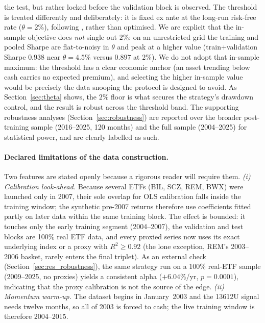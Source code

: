 the test, but rather locked before the validation block is observed.
The threshold is treated differently and deliberately: it is fixed ex ante at
the long-run risk-free rate ($\theta=2\%$), following \citet{antonacci2014}, rather
than optimised. We are explicit that the in-sample objective does \emph{not} single
out $2\%$: on an unrestricted grid the training and pooled Sharpe are flat-to-noisy
in $\theta$ and peak at a higher value (train+validation Sharpe $0.938$ near
$\theta=4.5\%$ versus $0.897$ at $2\%$). We do not adopt that in-sample maximum: the
threshold has a clear economic anchor (an asset trending below cash carries no
expected premium), and selecting the higher in-sample value would be precisely the
data snooping the protocol is designed to avoid. As Section~\ref{sec:theta} shows,
the $2\%$ floor is what secures the strategy's drawdown control, and the result is
robust across the threshold band. The
supporting robustness analyses
(Section~\ref{sec:robustness}) are reported over the broader post-training sample
(2016--2025, 120 months) and the full sample (2004--2025) for statistical power,
and are clearly labelled as such.

\paragraph{Declared limitations of the data construction.}
Two features are stated openly because a rigorous reader will require them.
\emph{(i) Calibration look-ahead.} Because several ETFs (BIL, SCZ, REM, BWX) were
launched only in 2007, their sole overlap for OLS calibration falls inside the
training window; the synthetic pre-2007 returns therefore use coefficients fitted
partly on later data within the same training block. The effect is bounded: it
touches only the early training segment (2004--2007), the validation and test
blocks are 100\% real ETF data, and every proxied series now uses its exact
underlying index or a proxy with $R^2 \geq 0.92$ (the lone exception, REM's
2003--2006 basket, rarely enters the final triplet). As an external check
(Section~\ref{sec:res_robustness}), the same strategy run on a 100\% real-ETF
sample (2009--2025, no proxies) yields a consistent alpha ($+6.04\%$/yr,
$p = 0.0001$), indicating that the proxy calibration is not the source of the edge.
\emph{(ii) Momentum warm-up.} The dataset begins in January~2003 and the 13612U
signal needs twelve months, so all of 2003 is forced to cash; the live training
window is therefore 2004--2015.

